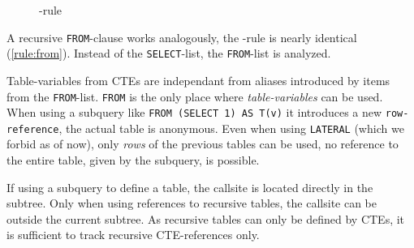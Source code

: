 \begin{figure}[h!]
    \centering\small
    \caption{\RSELECT-rule}
    \label{rule:select}
\end{figure}




A recursive \texttt{FROM}-clause works analogously, the \RFROM-rule is nearly identical (\autoref{rule:from}). Instead of the \texttt{SELECT}-list, the \texttt{FROM}-list is analyzed. 

Table-variables from CTEs are independant from aliases introduced by items from the \texttt{FROM}-list. \texttt{FROM} is the only place where \textit{table-variables} can be used. When using a subquery like \texttt{FROM (SELECT 1) AS T(v)} it introduces a new \texttt{row-reference}, the actual table is anonymous. Even when using \texttt{LATERAL} (which we forbid as of now), only \textit{rows} of the previous tables can be used, no reference to the entire table, given by the subquery, is possible.

If using a subquery to define a table, the callsite is located directly in the subtree. Only when using references to recursive tables, the callsite can be outside the current subtree. As recursive tables can only be defined by CTEs, it is sufficient to track recursive CTE-references only.

